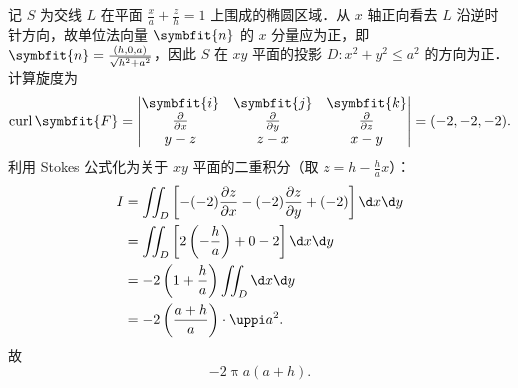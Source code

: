\begin{solution}
    记 $S$ 为交线 $L$ 在平面 $\frac{x}{a}+\frac{z}{h}=1$ 上围成的椭圆区域．从 $x$ 轴正向看去 $L$ 沿逆时针方向，故单位法向量 $\symbfit{n}$ 的 $x$ 分量应为正，即 $\symbfit{n} = \frac{(h, 0, a)}{\sqrt{h^2+a^2}}$，因此 $S$ 在 $xy$ 平面的投影 $D \colon x^2+y^2 \leqslant a^2$ 的方向为正．
    计算旋度为
    \begin{equation}
        \operatorname{curl} \symbfit{F} = \left| \begin{matrix} \symbfit{i} & \symbfit{j} & \symbfit{k} \\ \frac{\partial}{\partial x} & \frac{\partial}{\partial y} & \frac{\partial}{\partial z} \\ y-z & z-x & x-y \end{matrix} \right| = (-2, -2, -2).
    \end{equation}
    利用 Stokes 公式化为关于 $xy$ 平面的二重积分（取 $z = h - \frac{h}{a}x$）：
    \begin{equation}
        \label{eq:stokes-2}
        \begin{aligned}
            I & = \iint_D \left[ -(-2)\frac{\partial z}{\partial x} - (-2)\frac{\partial z}{\partial y} + (-2) \right] \d x \d y \\
              & = \iint_D \left[ 2 \left( -\frac{h}{a} \right) + 0 - 2 \right] \d x \d y                                         \\
              & = -2 \left( 1 + \frac{h}{a} \right) \iint_D \d x \d y                                                            \\
              & = -2 \left( \frac{a+h}{a} \right) \cdot \uppi a^2.
        \end{aligned}
    \end{equation}
    故
    \begin{equation}
        \label{eq:res-2}
        \boxed{-2\uppi a(a+h)}.
    \end{equation}



\end{solution}
